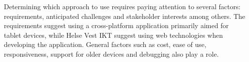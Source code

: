 




Determining which approach to use requires paying attention to several factors: requirements, anticipated challenges and stakeholder interests among others. The requirements suggest using a cross-platform application primarily aimed for tablet devices, while Helse Vest IKT suggest using web technologies when developing the application. General factors such as cost, ease of use, responsiveness, support for older devices and debugging also play a role.

